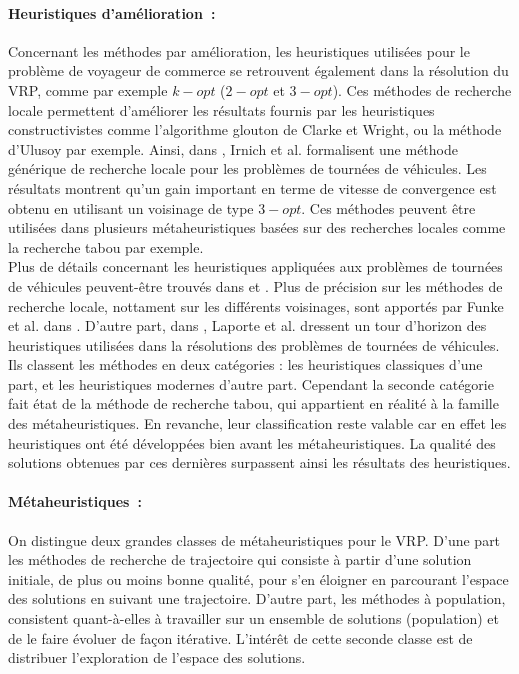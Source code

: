 
\paragraph{Heuristiques d'amélioration~:}

Concernant les méthodes par amélioration, les heuristiques utilisées pour le problème de voyageur de commerce se retrouvent également dans la résolution du VRP, comme par exemple $k-opt$ ($2-opt$ et $3-opt$). Ces méthodes de recherche locale permettent d'améliorer les résultats fournis par les heuristiques constructivistes comme l'algorithme glouton de Clarke et Wright, ou la méthode d'Ulusoy par exemple. Ainsi, 	dans \cite{Irnich2006}, Irnich et al. formalisent une méthode générique de recherche locale pour les problèmes de tournées de véhicules. Les résultats montrent qu'un gain important en terme de vitesse de convergence est obtenu en utilisant un voisinage de type $3-opt$.
Ces méthodes peuvent être utilisées dans plusieurs métaheuristiques basées sur des recherches locales comme la recherche tabou par exemple.\\


Plus de détails concernant les heuristiques appliquées aux problèmes de tournées de véhicules peuvent-être trouvés dans \cite{Bodin1983} et \cite{Laporte1992}. Plus de précision sur les méthodes de recherche locale, nottament sur les différents voisinages, sont apportés par Funke et al. dans \cite{Funke2005}. D'autre part, dans \cite{Laporte2000}, Laporte et al. dressent un tour d'horizon des heuristiques utilisées dans la résolutions des problèmes de tournées de véhicules. Ils classent les méthodes en deux catégories : les heuristiques classiques d'une part, et les heuristiques modernes d'autre part. Cependant la seconde catégorie fait état de la méthode de recherche tabou, qui appartient en réalité à la famille des métaheuristiques. En revanche, leur classification reste valable car en effet les heuristiques ont été développées bien avant les métaheuristiques. La qualité des solutions obtenues par ces dernières surpassent ainsi les résultats des heuristiques.


\paragraph{Métaheuristiques~:}

On distingue deux grandes classes de métaheuristiques pour le VRP. D'une part les méthodes de recherche de trajectoire qui consiste à partir d'une solution initiale, de plus ou moins bonne qualité, pour s'en éloigner en parcourant l'espace des solutions en suivant une trajectoire. D'autre part, les méthodes à population, consistent quant-à-elles à travailler sur un ensemble de solutions (population) et de le faire évoluer de façon itérative. L'intérêt de cette seconde classe est de distribuer l'exploration de l'espace des solutions.

